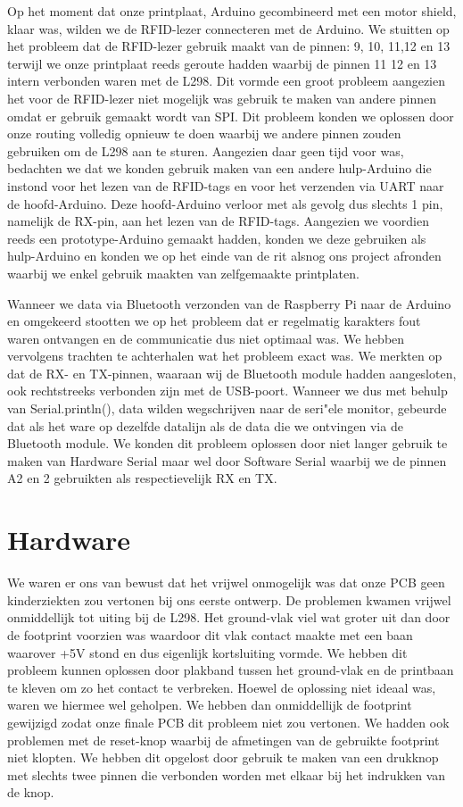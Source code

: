 Op het moment dat onze printplaat, Arduino gecombineerd met een motor shield, klaar was, wilden we de RFID-lezer connecteren met de Arduino. We stuitten op het probleem dat de RFID-lezer gebruik maakt van de pinnen: 9, 10, 11,12 en 13 terwijl we onze printplaat reeds geroute hadden waarbij de pinnen 11 12 en 13 intern verbonden waren met de L298. Dit vormde een groot probleem aangezien het voor de RFID-lezer niet mogelijk was gebruik te maken van andere pinnen omdat er gebruik gemaakt wordt van SPI. Dit probleem konden we oplossen door onze routing volledig opnieuw te doen waarbij we andere pinnen zouden gebruiken om de L298 aan te sturen. Aangezien daar geen tijd voor was, bedachten we dat we konden gebruik maken van een andere hulp-Arduino die instond voor het lezen van de RFID-tags en voor het verzenden via UART naar de hoofd-Arduino. Deze hoofd-Arduino verloor met als gevolg dus slechts 1 pin, namelijk de RX-pin, aan het lezen van de RFID-tags. Aangezien we voordien reeds een prototype-Arduino gemaakt hadden, konden we deze gebruiken als hulp-Arduino en konden we op het einde van de rit alsnog ons project afronden waarbij we enkel gebruik maakten van zelfgemaakte printplaten.

Wanneer we data via Bluetooth verzonden van de Raspberry Pi naar de Arduino en omgekeerd stootten we op het probleem dat er regelmatig karakters fout waren ontvangen en de communicatie dus niet optimaal was. We hebben vervolgens trachten te achterhalen wat het probleem exact was. We merkten op dat de RX- en TX-pinnen, waaraan wij de Bluetooth module hadden aangesloten, ook rechtstreeks verbonden zijn met de USB-poort. Wanneer we dus met behulp van Serial.println(), data wilden wegschrijven naar de seri"ele monitor, gebeurde dat als het ware op dezelfde datalijn als de data die we ontvingen via de Bluetooth module. We konden dit probleem oplossen door niet langer gebruik te maken van Hardware Serial maar wel door Software Serial waarbij we de pinnen A2 en 2 gebruikten als respectievelijk RX en TX.

\section{Hardware}
We waren er ons van bewust dat het vrijwel onmogelijk was dat onze PCB geen kinderziekten zou vertonen bij ons eerste ontwerp. De problemen kwamen vrijwel onmiddellijk tot uiting bij de L298. Het ground-vlak viel wat groter uit dan door de footprint voorzien was waardoor dit vlak contact maakte met een baan waarover +5V stond en dus eigenlijk kortsluiting vormde. We hebben dit probleem kunnen oplossen door plakband tussen het ground-vlak en de printbaan te kleven om zo het contact te verbreken. Hoewel de oplossing niet ideaal was, waren we hiermee wel geholpen. We hebben dan onmiddellijk de footprint gewijzigd zodat onze finale PCB dit probleem niet zou vertonen. We hadden ook problemen met de reset-knop waarbij de afmetingen van de gebruikte footprint niet klopten. We hebben dit opgelost door gebruik te maken van een drukknop met slechts twee pinnen die verbonden worden met elkaar bij het indrukken van de knop. 


